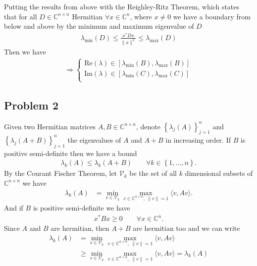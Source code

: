 Putting the results from above with the Reighley-Ritz Theorem, which states
that for all $D \in \mathbb{C}^{n\times n}$ Hermitian $\forall x \in
\mathbb{C}^{n}$, where $x\neq 0 $ we have a boundary from below and above by
the minimum and maximum eigenvalue of $D$
\begin{align}
    \lambda_{\text{min}}(D) \le \frac{x^*Dx}{\|x\|^2} \le
    \lambda_{\text{max}}(D)
\end{align}
Then we have
\begin{align}
    \Rightarrow  \begin{cases}
        \text{Re}(\lambda) \in [ \lambda_{\text{min}}(B),
        \lambda_{\text{max}}(B)]\\
        \text{Im}(\lambda) \in [ \lambda_{\text{min}}(C),
        \lambda_{\text{max}}(C)]\\
    \end{cases}
\end{align}
\subsection{Problem 2}
Given two Hermitian matrices $A, B \in \mathbb{C}^{n\times n}$, denote
$\left\{ \lambda_j(A) \right\}_{j=1}^n $ and $\left\{ \lambda_j(A + B)
\right\}_{j=1}^n$ the eigenvalues of $A$ and $A+B$ in increasing order. If
$B$ is positive semi-definite then we have a bound
\begin{align}
    \lambda_k(A) \le \lambda_k(A+B) \qquad \forall k \in \left\{ 1, \ldots,n
    \right\}.
\end{align}
By the Courant Fischer Theorem, let $\mathcal{V}_k$ be the set of all $k$
dimensional subsets of $\mathbb{C}^{n\times n}$ we have
\begin{align}
    \lambda_k(A)
    &= \min_{v \in \mathcal{V}_k} \max_{v\in \mathbb{C}^{n \times
    n},\; \|v\|=1} \langle v, Av\rangle .
\end{align}
And if $B$ is positive  semi-definite we have
\begin{align}
    x^* B x \ge 0 \qquad \forall x \in \mathbb{C}^{n}.
\end{align}
Since $A$ and $B$ are hermitian, then $A+B$ are hermitian too and we can
write
\begin{align}
    \lambda_k(A)
    &= \min_{v \in \mathcal{V}_k} \max_{v\in \mathbb{C}^{n \times
    n},\; \|v\|=1} \langle v, Av\rangle \\
    &\ge \min_{v \in \mathcal{V}_k} \max_{v\in \mathbb{C}^{n \times
    n},\; \|v\|=1} \langle v, Av\rangle = \lambda_k(A)
\end{align}
